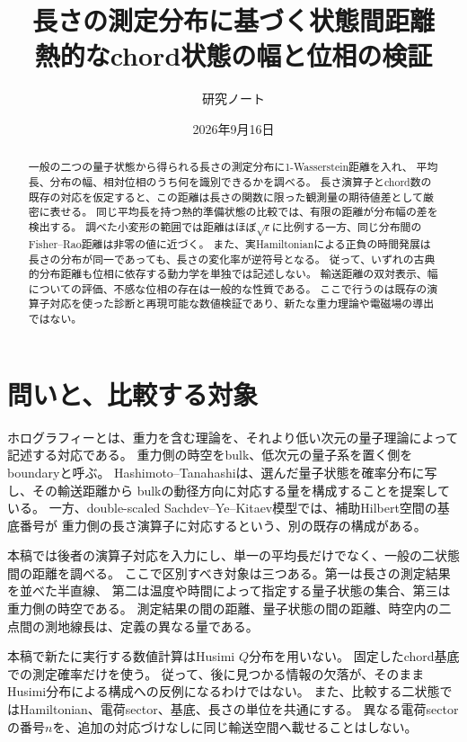 \documentclass[a4paper,11pt]{ltjsarticle}
\title{長さの測定分布に基づく状態間距離\\熱的なchord状態の幅と位相の検証}
\author{研究ノート}
\date{2026年9月16日}
\numberwithin{equation}{section}
\begin{document}
\maketitle
\begin{abstract}
一般の二つの量子状態から得られる長さの測定分布に1-Wasserstein距離を入れ、
平均長、分布の幅、相対位相のうち何を識別できるかを調べる。
長さ演算子とchord数の既存の対応を仮定すると、この距離は長さの関数に限った観測量の期待値差として厳密に表せる。
同じ平均長を持つ熱的準備状態の比較では、有限の距離が分布幅の差を検出する。
調べた小変形の範囲では距離はほぼ$\sqrt\epsilon$に比例する一方、同じ分布間のFisher--Rao距離は非零の値に近づく。
また、実Hamiltonianによる正負の時間発展は長さの分布が同一であっても、長さの変化率が逆符号となる。
従って、いずれの古典的分布距離も位相に依存する動力学を単独では記述しない。
輸送距離の双対表示、幅についての評価、不感な位相の存在は一般的な性質である。
ここで行うのは既存の演算子対応を使った診断と再現可能な数値検証であり、新たな重力理論や電磁場の導出ではない。
\end{abstract}
\setcounter{tocdepth}{1}
\tableofcontents
\clearpage

\section{問いと、比較する対象}
ホログラフィーとは、重力を含む理論を、それより低い次元の量子理論によって記述する対応である。
重力側の時空をbulk、低次元の量子系を置く側をboundaryと呼ぶ。
Hashimoto--Tanahashiは、選んだ量子状態を確率分布に写し、その輸送距離から
bulkの動径方向に対応する量を構成することを提案している\cite{HashimotoTanahashi}。
一方、double-scaled Sachdev--Ye--Kitaev模型では、補助Hilbert空間の基底番号が
重力側の長さ演算子に対応するという、別の既存の構成がある\cite{Heller}。

本稿では後者の演算子対応を入力にし、単一の平均長だけでなく、一般の二状態間の距離を調べる。
ここで区別すべき対象は三つある。第一は長さの測定結果を並べた半直線、
第二は温度や時間によって指定する量子状態の集合、第三は重力側の時空である。
測定結果の間の距離、量子状態の間の距離、時空内の二点間の測地線長は、定義の異なる量である。

本稿で新たに実行する数値計算はHusimi $Q$分布を用いない。
固定したchord基底での測定確率だけを使う。
従って、後に見つかる情報の欠落が、そのままHusimi分布による構成への反例になるわけではない。
また、比較する二状態ではHamiltonian、電荷sector、基底、長さの単位を共通にする。
異なる電荷sectorの番号$n$を、追加の対応づけなしに同じ輸送空間へ載せることはしない。
\end{document}
